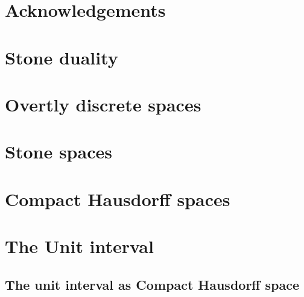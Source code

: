 \documentclass{../util/zariski}
\begin{document}
\section*{Acknowledgements}




\section{Stone duality}







\section{Overtly discrete spaces}



%
%
\section{Stone spaces}



\section{Compact Hausdorff spaces}




\section{The Unit interval}
\subsection{The unit interval as Compact Hausdorff space}


 
\end{document}
